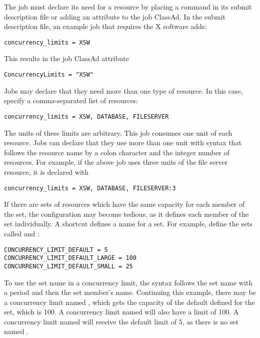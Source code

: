 The job must declare its need for a resource by placing a command
in its submit description file or adding an attribute to the
job ClassAd.
In the submit description file, an example job that requires
the X software adds:
\begin{verbatim}
concurrency_limits = XSW
\end{verbatim}
This results in the job ClassAd attribute
\begin{verbatim}
ConcurrencyLimits = "XSW"
\end{verbatim}

Jobs may declare that they need more than one type of resource.
In this case, specify a comma-separated list of resources:

\begin{verbatim}
concurrency_limits = XSW, DATABASE, FILESERVER
\end{verbatim}

The units of these limits are arbitrary. 
This job consumes one unit of each resource.
Jobs can declare that they use more than one unit with syntax
that follows the resource name by a colon character and the
integer number of resources.  
For example, if the above job uses three units of the file server resource,
it is declared with

\begin{verbatim}
concurrency_limits = XSW, DATABASE, FILESERVER:3
\end{verbatim}

If there are sets of resources which have the same
capacity for each member of the set,
the configuration may become tedious,
as it defines each member of the set individually.
A shortcut defines a name for a set.
For example, define the sets called  and :

\begin{verbatim}
CONCURRENCY_LIMIT_DEFAULT = 5
CONCURRENCY_LIMIT_DEFAULT_LARGE = 100
CONCURRENCY_LIMIT_DEFAULT_SMALL = 25
\end{verbatim}

To use the set name in a concurrency limit,
the syntax follows the set name with a period and then the set member's
name.
Continuing this example, 
there may be a concurrency limit named ,
which gets the capacity of the default defined for the
 set, which is 100. 
A concurrency limit named  will
also have a limit of 100.
A concurrency limit named
 will receive the default limit of 5, as
there is no set named .

